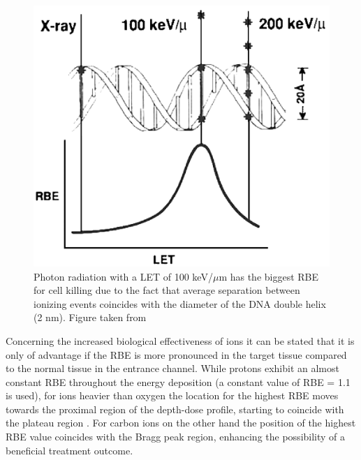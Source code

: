 \begin{figure}[H]
\begin{center}
\includegraphics[scale=0.5]{./teile/introduction/rbe_let.png}
\caption{Photon radiation with a LET of 100 keV/${\mu}$m has the biggest RBE for cell killing due to the fact that average separation between 
ionizing events coincides with the diameter of the DNA double helix (2 nm). Figure taken from \cite{Hal06}}
\label{rbe_let}
\end{center}
\end{figure}

Concerning the increased biological effectiveness of ions it can be stated that it is only of advantage if the RBE is more pronounced 
in the target tissue compared to the normal tissue in the entrance channel. While protons exhibit an almost constant RBE throughout the 
energy deposition (a constant value of RBE = 1.1 is used), for ions heavier than oxygen the location for the highest RBE moves towards the 
proximal region of the depth-dose profile, starting to coincide with the plateau region \cite{Kra00}. For carbon ions on the other hand 
the position of the highest RBE value coincides with the Bragg peak region, enhancing the possibility of a beneficial treatment outcome. 



\newpage


